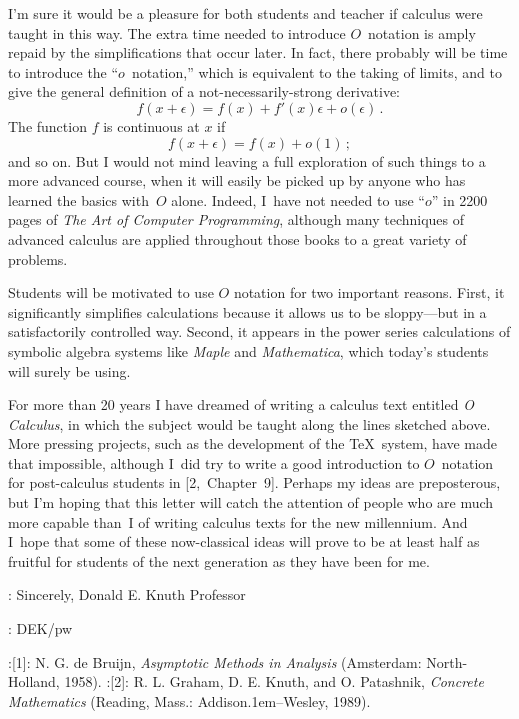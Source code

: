 I'm sure it would be a pleasure for both students and teacher if calculus
were taught in this way.  The extra time needed to introduce $O$~notation
is amply repaid by the simplifications that occur later.  In fact, there
probably will be time to introduce the ``$o$~notation,'' which is
equivalent to the taking of limits, and to give the general definition 
of a not-necessarily-strong derivative:
$$f(x+\epsilon)=f(x)+f'(x)\epsilon+o(\epsilon)\,.$$
The function $f$ is continuous at $x$ if
$$f(x+\epsilon)=f(x)+o(1)\,;$$
and so on.  But I would not mind leaving a full exploration of such things 
to a more advanced course, when it will easily be picked up by anyone who
has learned the basics with~$O$ alone.  Indeed, I~have not needed to use
``$o$'' in 2200 pages of {\sl The Art of Computer Programming}, although
many techniques of advanced calculus are applied throughout those books to
a great variety of problems.

Students will be motivated to use $O$ notation for two important
reasons. First, it significantly simplifies calculations because it allows
us to be sloppy---but in a satisfactorily controlled way.  Second, it
appears in the power series calculations of symbolic algebra systems like
{\sl Maple\/} and {\sl Mathematica}, which today's students will surely be
using.

For more than 20 years I have dreamed of writing a calculus text entitled
{\sl O Calculus}, in which the subject would be taught along the lines
sketched above.  More pressing projects, such as the development of the
\TeX\ system, have made that impossible, although I~did try to write a good
introduction to $O$~notation for post-calculus students in [2,~Chapter~9].
Perhaps my ideas are preposterous, but I'm hoping that this letter will
catch the attention of people who are much more capable than~I of writing
calculus texts for the new millennium.  And I~hope that some of these 
now-classical ideas will prove to be at least half as fruitful for 
students of the next generation as they have been for me.

\adx 150pt:
Sincerely,\cr
Donald E. Knuth\cr
Professor\cr

:
DEK/pw\cr

\medskip

\disleft 20pt:[1]:
N. G. de Bruijn, {\sl Asymptotic Methods in Analysis\/} (Amsterdam:
North-Holland, 1958).
\smallskip
\disleft 20pt:[2]:
R. L. Graham, D. E. Knuth, and O. Patashnik, {\sl Concrete Mathematics\/}
(Reading, Mass.: Addison\kern.1em--Wesley, 1989).

\bye
